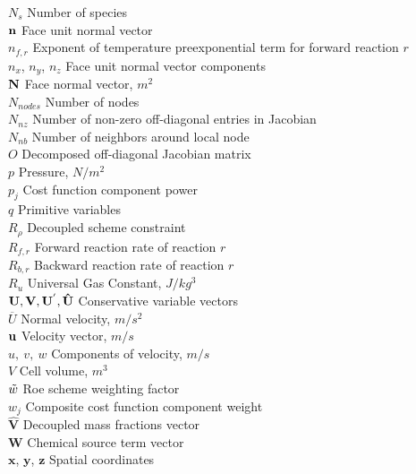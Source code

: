 \begin{tabbing}
  $N_s$ \> Number of species \\
  $\mathbf{n}$ \> Face unit normal vector \\
  $n_{f,r}$ \> Exponent of temperature preexponential term for forward reaction $r$ \\
  $n_x$, $n_y$, $n_z$ \> Face unit normal vector components \\
  $\mathbf{N}$ \> Face normal vector, $m^2$ \\
  $N_{nodes}$ \> Number of nodes \\
  $N_{nz}$ \> Number of non-zero off-diagonal entries in Jacobian \\
  $N_{nb}$ \> Number of neighbors around local node \\
  $O$ \> Decomposed off-diagonal Jacobian matrix \\
  $p$ \> Pressure, $N/m^2$ \\
  $p_j$ \> Cost function component power \\
  $q$ \> Primitive variables \\
  $R_\rho$ \> Decoupled scheme constraint \\
  $R_{f,r}$ \> Forward reaction rate of reaction $r$ \\
  $R_{b,r}$ \> Backward reaction rate of reaction $r$ \\
  $R_u$ \> Universal Gas Constant, $J/kg^3$ \\
  $\mathbf U,\mathbf V, \mathbf U^{'},\mathbf{\hat{U}}$ \> Conservative variable vectors \\
  $\overline{U}$ \> Normal velocity, $m/s^2$ \\
  $\mathbf u$ \> Velocity vector, $m/s$ \\
  $u,\ v,\ w$ \> Components of velocity, $m/s$ \\
  $V$ \> Cell volume, $m^3$ \\
  $\tilde{w}$ \> Roe scheme weighting factor \\
  $w_j$ \> Composite cost function component weight \\
  $\mathbf{\hat{V}}$ \>  Decoupled mass fractions vector \\
  $\mathbf{W}$ \> Chemical source term vector \\
  $\mathbf{x}$, $\mathbf{y}$, $\mathbf{z}$ \> Spatial coordinates \\
 \end{tabbing}

